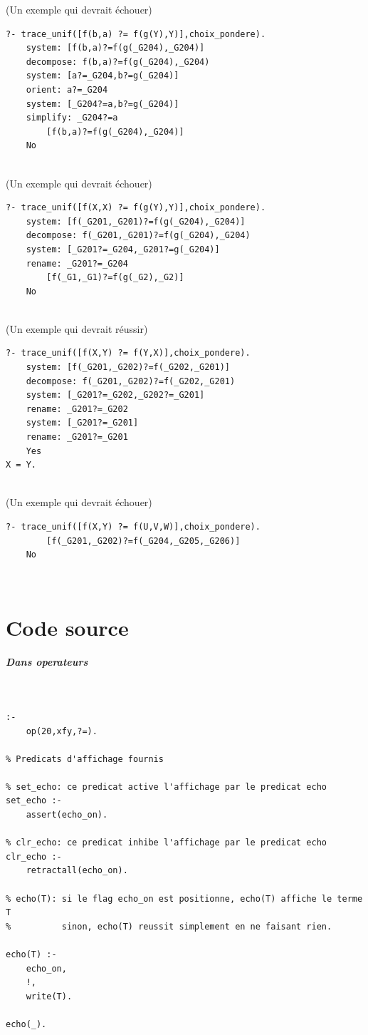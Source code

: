\documentclass[10pt,a4paper]{report}
\begin{document}
(Un exemple qui devrait échouer)
\begin{lstlisting}[caption ={Des tests de cours}]
?- trace_unif([f(b,a) ?= f(g(Y),Y)],choix_pondere).
	system: [f(b,a)?=f(g(_G204),_G204)]
	decompose: f(b,a)?=f(g(_G204),_G204)
	system: [a?=_G204,b?=g(_G204)]
	orient: a?=_G204
	system: [_G204?=a,b?=g(_G204)]
	simplify: _G204?=a
        [f(b,a)?=f(g(_G204),_G204)]
	No
\end{lstlisting} ~\\

(Un exemple qui devrait échouer)
\begin{lstlisting}[caption ={Des tests de cours}]
?- trace_unif([f(X,X) ?= f(g(Y),Y)],choix_pondere).
	system: [f(_G201,_G201)?=f(g(_G204),_G204)]
	decompose: f(_G201,_G201)?=f(g(_G204),_G204)
	system: [_G201?=_G204,_G201?=g(_G204)]
	rename: _G201?=_G204
        [f(_G1,_G1)?=f(g(_G2),_G2)]
	No
\end{lstlisting} ~\\

(Un exemple qui devrait réussir)
\begin{lstlisting}[caption ={Des tests de cours}]
?- trace_unif([f(X,Y) ?= f(Y,X)],choix_pondere).
	system: [f(_G201,_G202)?=f(_G202,_G201)]
	decompose: f(_G201,_G202)?=f(_G202,_G201)
	system: [_G201?=_G202,_G202?=_G201]
	rename: _G201?=_G202
	system: [_G201?=_G201]
	rename: _G201?=_G201
	Yes
X = Y.
\end{lstlisting} ~\\

(Un exemple qui devrait échouer)
\begin{lstlisting}[caption ={Des tests de cours}]
?- trace_unif([f(X,Y) ?= f(U,V,W)],choix_pondere).
        [f(_G201,_G202)?=f(_G204,_G205,_G206)]
	No
\end{lstlisting} ~\\







\mbox{}
\newpage
\chapter*{Code source}
\paragraph{Dans operateurs} ~\\
\begin{lstlisting}[caption ={$operateurs.pl$}]
:-
	op(20,xfy,?=).

% Predicats d'affichage fournis

% set_echo: ce predicat active l'affichage par le predicat echo
set_echo :-
	assert(echo_on).

% clr_echo: ce predicat inhibe l'affichage par le predicat echo
clr_echo :-
	retractall(echo_on).

% echo(T): si le flag echo_on est positionne, echo(T) affiche le terme T
%          sinon, echo(T) reussit simplement en ne faisant rien.

echo(T) :-
	echo_on,
	!,
	write(T).

echo(_).
\end{lstlisting}
\end{document}
